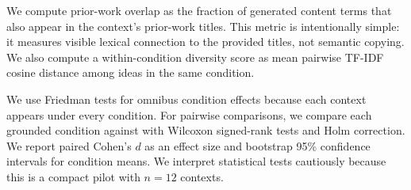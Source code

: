  We compute prior-work overlap as the fraction of generated content terms that also appear in the context's prior-work titles. This metric is intentionally simple: it measures visible lexical connection to the provided titles, not semantic copying. We also compute a within-condition diversity score as mean pairwise TF-IDF cosine distance among ideas in the same condition.

 We use Friedman tests for omnibus condition effects because each context appears under every condition. For pairwise comparisons, we compare each grounded condition against \ungrounded with Wilcoxon signed-rank tests and Holm correction. We report paired Cohen's $d$ as an effect size and bootstrap 95\% confidence intervals for condition means. We interpret statistical tests cautiously because this is a compact pilot with $n=12$ contexts.
